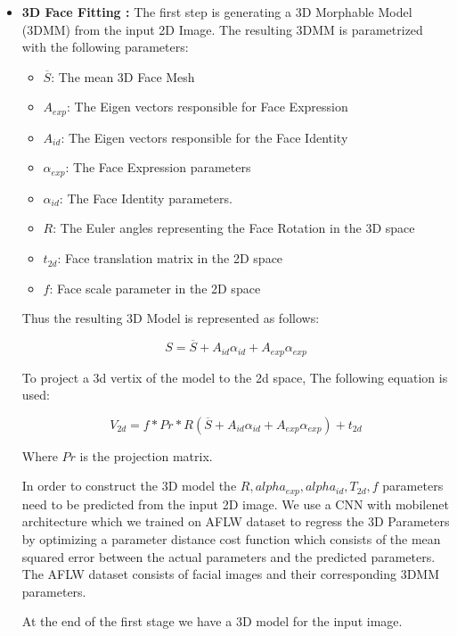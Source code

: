 \begin{itemize}
    \item \textbf{3D Face Fitting :} The first step is generating a 3D Morphable Model (3DMM) from the input 2D Image. The resulting 3DMM is parametrized with the following parameters:
        \begin{itemize}
            \item $\overline{S}$: The mean 3D Face Mesh 
            \item $A _{exp}$: The Eigen vectors responsible for Face Expression
            \item $A _{id}$: The Eigen vectors responsible for the Face Identity
            \item $\alpha _{exp}$: The Face Expression parameters
            \item $\alpha _{id}$: The Face Identity parameters.
            \item $R$: The Euler angles representing the Face Rotation in the 3D space
            \item $t _{2d}$: Face translation matrix in the 2D space
            \item $f$: Face scale parameter in the 2D space
        \end{itemize}
        
        Thus the resulting 3D Model is represented as follows:
        
        \[ S = \overline{S} + A _{id}\alpha _{id} + A _{exp}\alpha _{exp} \]
        
        To project a 3d vertix of the model to the 2d space, The following equation is used:
        
        \[V _{2d} = f*Pr*R(\overline{S} + A _{id}\alpha _{id} + A _{exp}\alpha _{exp}) + t _{2d}\]
        
        Where $Pr$ is the projection matrix.
        
        In order to construct the 3D model the $R, alpha _{exp}, alpha _{id}, T _{2d}, f$ parameters need to be predicted from the input 2D image. We use a CNN with mobilenet architecture which we trained on AFLW dataset to regress the 3D Parameters by optimizing a parameter distance cost function which consists of the mean squared error between the actual parameters and the predicted parameters. The AFLW dataset consists of facial images and their corresponding 3DMM parameters. 
        
        At the end of the first stage we have a 3D model for the input image.
        

\end{itemize}
